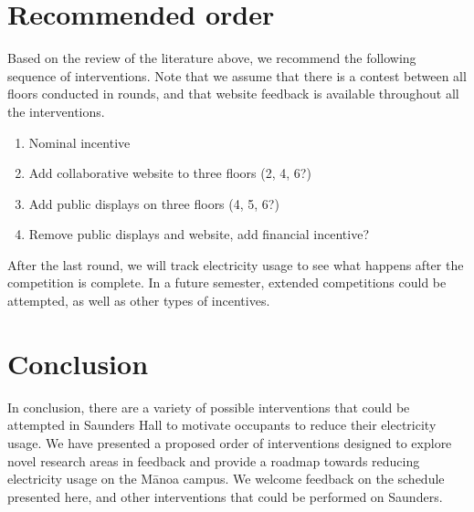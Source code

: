 \documentclass[11pt]{article}
\begin{document}
%

\section{Recommended order}

Based on the review of the literature above, we recommend the following sequence of interventions. Note that we assume that there is a contest between all floors conducted in rounds, and that website feedback is available throughout all the interventions.

\begin{enumerate}
	\item Nominal incentive
	\item Add collaborative website to three floors (2, 4, 6?)
	\item Add public displays on three floors (4, 5, 6?)
	\item Remove public displays and website, add financial incentive?
\end{enumerate}

After the last round, we will track electricity usage to see what happens after the competition is complete. In a future semester, extended competitions could be attempted, as well as other types of incentives.

\section{Conclusion}

In conclusion, there are a variety of possible interventions that could be attempted in Saunders Hall to motivate occupants to reduce their electricity usage. We have presented a proposed order of interventions designed to explore novel research areas in feedback and provide a roadmap towards reducing electricity usage on the M\=anoa campus. We welcome feedback on the schedule presented here, and other interventions that could be performed on Saunders.





%
%
\end{document}
